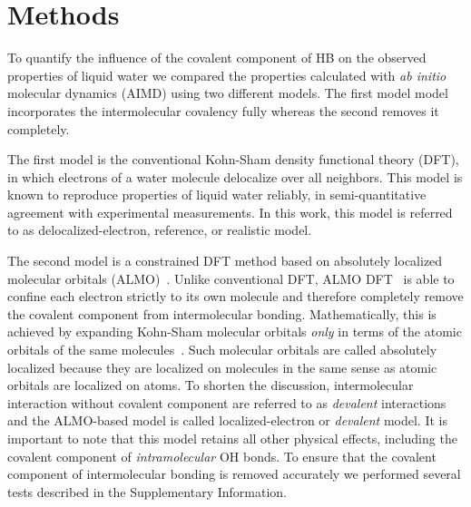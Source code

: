 \documentclass[aps,prl,reprint,amsmath,amssymb]{revtex4-1}
\begin{document}

\section{Methods}

To quantify the influence of the covalent component of HB on the observed properties of liquid water we compared the properties calculated with \emph{ab initio} molecular dynamics (AIMD) using two different models. 
The first model model incorporates the intermolecular covalency fully whereas the second removes it completely.

The first model is the conventional Kohn-Sham density functional theory (DFT), in which electrons of a water molecule delocalize over all neighbors. 
This model is known to reproduce properties of liquid water reliably, in semi-quantitative agreement with experimental measurements. 
In this work, this model is referred to as delocalized-electron, reference, or realistic model. 

The second model is a constrained DFT method based on absolutely localized molecular orbitals (ALMO)~\cite{khaliullin2006efficient}. 
Unlike conventional DFT, ALMO DFT~\cite{Khaliullin2013JCTC} is able to confine each electron strictly to its own molecule and therefore completely remove the covalent component from intermolecular bonding. 
Mathematically, this is achieved by expanding Kohn-Sham molecular orbitals \emph{only} in terms of the atomic orbitals of the same molecules~\cite{gian,khaliullin2006efficient, blw}. 
Such molecular orbitals are called absolutely localized because they are localized on molecules in the same sense as atomic orbitals are localized on atoms. 
To shorten the discussion, intermolecular interaction without covalent component are referred to as \emph{devalent} interactions and the ALMO-based model is called localized-electron or \emph{devalent} model. 
It is important to note that this model retains all other physical effects, including the covalent component of \emph{intramolecular} OH bonds. %
To ensure that the covalent component of intermolecular bonding is removed accurately we performed several tests described in the Supplementary Information.
\end{document}
